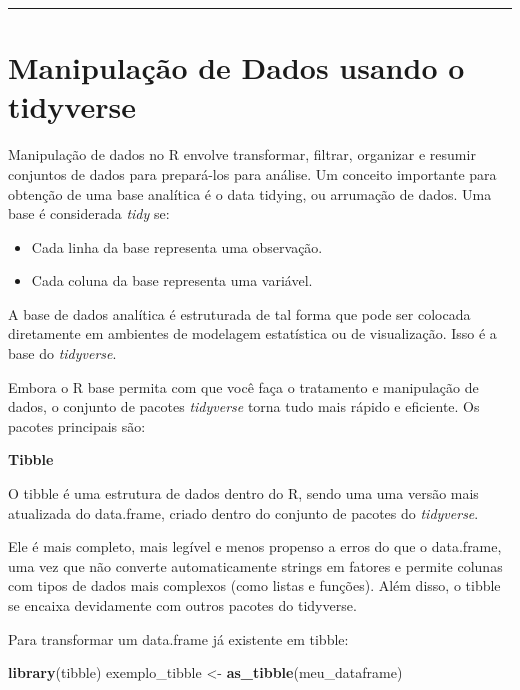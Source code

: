 \documentclass[
]{book}
\newenvironment{Shaded}{\begin{snugshade}}{\end{snugshade}}
\newcommand{\FunctionTok}[1]{\textcolor[rgb]{0.13,0.29,0.53}{\textbf{#1}}}
\newcommand{\NormalTok}[1]{#1}
\newcommand{\OtherTok}[1]{\textcolor[rgb]{0.56,0.35,0.01}{#1}}
\providecommand{\tightlist}{%
  \setlength{\itemsep}{0pt}\setlength{\parskip}{0pt}}
\begin{document}
\begin{center}\rule{0.5\linewidth}{0.5pt}\end{center}

\section{Manipulação de Dados usando o tidyverse}\label{manipulauxe7uxe3o-de-dados-usando-o-tidyverse}

Manipulação de dados no R envolve transformar, filtrar, organizar e resumir conjuntos de dados para prepará-los para análise. Um conceito importante para obtenção de uma base analítica é o data tidying, ou arrumação de dados. Uma base é considerada \emph{tidy} se:

\begin{itemize}
\tightlist
\item
  Cada linha da base representa uma observação.
\item
  Cada coluna da base representa uma variável.
\end{itemize}

A base de dados analítica é estruturada de tal forma que pode ser colocada diretamente em ambientes de modelagem estatística ou de visualização. Isso é a base do \emph{tidyverse}.

Embora o R base permita com que você faça o tratamento e manipulação de dados, o conjunto de pacotes \emph{tidyverse} torna tudo mais rápido e eficiente. Os pacotes principais são:

\textbf{Tibble}

O tibble é uma estrutura de dados dentro do R, sendo uma uma versão mais atualizada do data.frame, criado dentro do conjunto de pacotes do \emph{tidyverse}.

Ele é mais completo, mais legível e menos propenso a erros do que o data.frame, uma vez que não converte automaticamente strings em fatores e permite colunas com tipos de dados mais complexos (como listas e funções). Além disso, o tibble se encaixa devidamente com outros pacotes do tidyverse.

Para transformar um data.frame já existente em tibble:

\begin{Shaded}
\begin{Highlighting}[]
\FunctionTok{library}\NormalTok{(tibble)}
\NormalTok{exemplo\_tibble }\OtherTok{\textless{}{-}} \FunctionTok{as\_tibble}\NormalTok{(meu\_dataframe)}
\end{Highlighting}
\end{Shaded}
\end{document}
